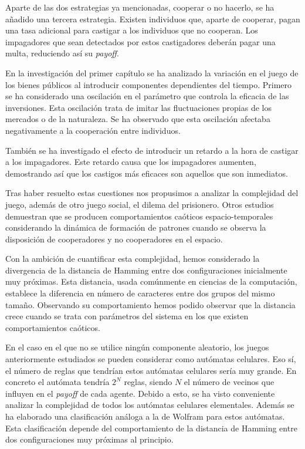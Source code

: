 Aparte de las dos estrategias ya mencionadas, cooperar o no hacerlo, se ha añadido una tercera estrategia. Existen individuos que, aparte de cooperar, pagan una tasa adicional para castigar a los individuos que no cooperan. Los impagadores que sean detectados por estos castigadores deberán pagar una multa, reduciendo así su \textit{payoff}.

En la investigación del primer capítulo se ha analizado la variación en el juego de los bienes públicos al introducir componentes dependientes del tiempo. Primero se ha considerado una oscilación en el parámetro que controla la eficacia de las inversiones. Esta oscilación trata de imitar las fluctuaciones propias de los mercados o de la naturaleza. Se ha observado que esta oscilación afectaba negativamente a la cooperación entre individuos. 

También se ha investigado el efecto de introducir un retardo a la hora de castigar a los impagadores. Este retardo causa que los impagadores aumenten, demostrando así que los castigos más eficaces son aquellos que son inmediatos.

Tras haber resuelto estas cuestiones nos propusimos a analizar la complejidad del juego, además de otro juego social, el dilema del prisionero. Otros estudios demuestran que se producen comportamientos caóticos espacio-temporales considerando la dinámica de formación de patrones cuando se observa la disposición de cooperadores y no cooperadores en el espacio. 

Con la ambición de cuantificar esta complejidad, hemos considerado la divergencia de la distancia de Hamming entre dos configuraciones inicialmente muy próximas. Esta distancia, usada comúnmente en ciencias de la computación, establece la diferencia en número de caracteres entre dos grupos del mismo tamaño. Observando su comportamiento hemos podido observar que la distancia crece cuando se trata con parámetros del sistema en los que existen comportamientos caóticos.

En el caso en el que no se utilice ningún componente aleatorio, los juegos anteriormente estudiados se pueden considerar como autómatas celulares. Eso sí, el número de reglas que tendrían estos autómatas celulares sería muy grande. En concreto el autómata tendría $2^N$ reglas, siendo $N$ el número de vecinos que influyen en el \textit{payoff} de cada agente. Debido a esto, se ha visto conveniente analizar la complejidad de todos los autómatas celulares elementales. Además se ha elaborado una clasificación análoga a la de Wolfram para estos autómatas. Esta clasificación depende del comportamiento de la distancia de Hamming entre dos configuraciones muy próximas al principio.

